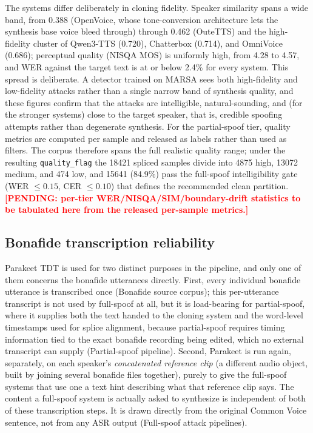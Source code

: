 \documentclass[11pt]{article}
\newcommand{\PENDING}[1]{\textcolor{red}{\textbf{[PENDING: #1]}}}
\begin{document}
The systems differ deliberately in cloning fidelity. Speaker similarity
spans a wide band, from 0.388 (OpenVoice, whose tone-conversion
architecture lets the synthesis base voice bleed through) through 0.462
(OuteTTS) and the high-fidelity cluster of Qwen3-TTS (0.720), Chatterbox
(0.714), and OmniVoice (0.686); perceptual quality (NISQA MOS) is
uniformly high, from 4.28 to 4.57, and WER against the target text is at or below
2.4\% for every system. This spread is deliberate. A detector trained on
MARSA sees both high-fidelity and low-fidelity attacks rather than a
single narrow band of synthesis quality, and these figures confirm that
the attacks are intelligible, natural-sounding, and (for the stronger
systems) close to the target speaker, that is, credible spoofing
attempts rather than degenerate synthesis. For the partial-spoof tier, quality metrics
are computed per sample and released as labels rather than used as
filters. The corpus therefore spans the full realistic quality range;
under the resulting \texttt{quality\_flag} the 18421 spliced samples
divide into 4875 high, 13072 medium, and 474 low, and 15641
(84.9\%) pass the full-spoof intelligibility gate (WER $\leq 0.15$,
CER $\leq 0.10$) that defines the recommended clean partition.
\PENDING{per-tier WER/NISQA/SIM/boundary-drift statistics to be
tabulated here from the released per-sample metrics.}

\subsection*{Bonafide transcription reliability}

Parakeet TDT is used for two distinct purposes in the pipeline, and only
one of them concerns the bonafide utterances directly. First, every
individual bonafide utterance is transcribed once (Bonafide source
corpus); this per-utterance transcript is not used by full-spoof at all,
but it is load-bearing for partial-spoof, where it supplies both the
text handed to the cloning system and the word-level timestamps used for
splice alignment, because partial-spoof requires timing information tied
to the exact bonafide recording being edited, which no external
transcript can supply (Partial-spoof pipeline). Second, Parakeet is run
again, separately, on each speaker's \emph{concatenated reference clip}
(a different audio object, built by joining several bonafide files
together), purely to give the full-spoof systems that use one a text
hint describing what that reference clip says. The content a full-spoof
system is actually asked to synthesize is independent of both of these
transcription steps. It is drawn directly from the original Common Voice
sentence, not from any ASR output (Full-spoof attack pipelines).
\end{document}
